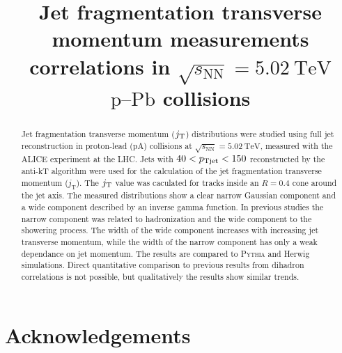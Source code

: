 \documentclass[ALICE,manyauthors]{cernphprep}
\newcommand{\pPb}{\ensuremath{\mbox{p--Pb}}}
\newcommand{\sqrtSnn}{\ensuremath{\sqrt{s_{\mathrm{NN}}}}}
\newcommand{\sqrtSnnE}[2][TeV]{\ensuremath{\sqrtSnn = #2~\mathrm{#1}}}
\def\pt#1{\ensuremath{p_{\rm T#1}}}
\def\jt#1{\ensuremath{j_{\rm T#1}}}
\begin{document}
\begin{titlepage}
%
%

\title{Jet fragmentation transverse momentum measurements correlations in $\sqrtSnnE{5.02}$ $\pPb$ collisions}


\begin{abstract}
Jet fragmentation transverse momentum ($\jt{}$) distributions were studied using full jet reconstruction in proton-lead (pA) collisions at $\sqrtSnnE{5.02}$, measured with the ALICE experiment at the LHC. Jets with $ 40 < \pt{jet } <150$ reconstructed by the anti-kT algorithm were used for the calculation of the jet fragmentation transverse momentum ($j_\mathrm{T}$). The $\jt{}$ value was caculated for tracks inside an $R=0.4$ cone around the jet axis. The measured distributions show a clear narrow Gaussian component and a wide component described by an inverse gamma function. In previous studies the narrow component was related to hadronization and the wide component to the showering process. The width of the wide component increases with increasing jet transverse momentum, while the width of the narrow component has only a weak dependance on jet momentum. The results are compared to \textsc{Pythia} and Herwig simulations. Direct quantitative comparison to previous results from dihadron correlations is not possible, but qualitatively the results show similar trends.
\end{abstract}
\end{titlepage}
\setcounter{page}{2}

 


\newenvironment{acknowledgement}{\relax}{\relax}
\begin{acknowledgement}
\section*{Acknowledgements}
\end{acknowledgement}
\end{document}
